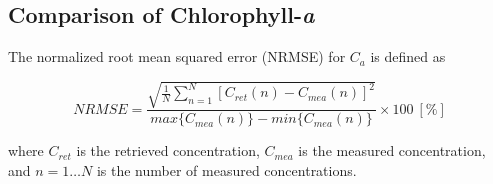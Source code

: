\documentclass[]{spie}  %
\begin{document}
\subsection{Comparison of Chlorophyll-{\it a}}
The normalized root mean squared error (NRMSE) for $C_a$ is defined as

\begin{equation}
\label{eq:NRMSEchl}
	NRMSE =\frac{\sqrt{\frac{1}{N}\sum_{n=1}^N{\left[C_{ret}(n) - C_{mea}(n)\right]^2}}}{max\{C_{mea}(n)\} - min\{C_{mea}(n)\}}\times100 ~[\%]
\end{equation}

\noindent where $C_{ret}$ is the retrieved concentration, $C_{mea}$ is the measured concentration, and $n=1\dots N$ is the number of measured concentrations.
\end{document}
